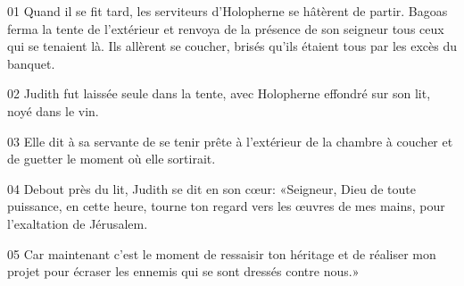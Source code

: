 01 Quand il se fit tard, les serviteurs d'Holopherne se hâtèrent de partir. Bagoas ferma la tente de l'extérieur et renvoya de la présence de son seigneur tous ceux qui se tenaient là. Ils allèrent se coucher, brisés qu'ils étaient tous par les excès du banquet.

02 Judith fut laissée seule dans la tente, avec Holopherne effondré sur son lit, noyé dans le vin.

03 Elle dit à sa servante de se tenir prête à l'extérieur de la chambre à coucher et de guetter le moment où elle sortirait.

04 Debout près du lit, Judith se dit en son cœur: «Seigneur, Dieu de toute puissance, en cette heure, tourne ton regard vers les œuvres de mes mains, pour l'exaltation de Jérusalem.

05 Car maintenant c'est le moment de ressaisir ton héritage et de réaliser mon projet pour écraser les ennemis qui se sont dressés contre nous.»
